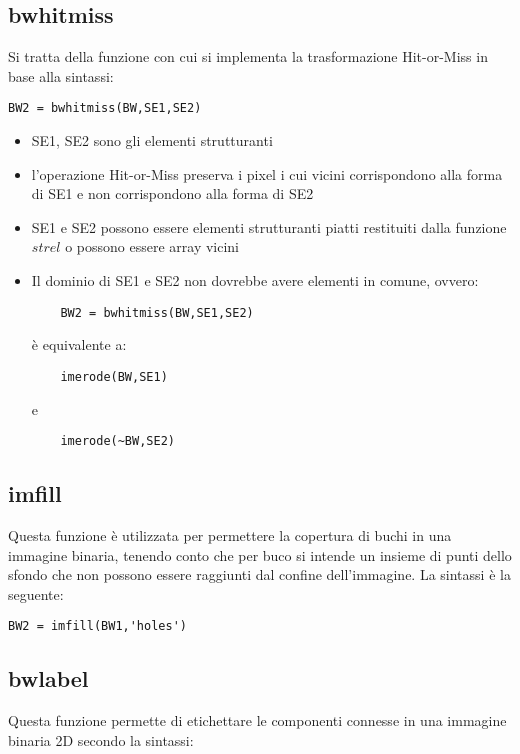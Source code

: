\subsection{bwhitmiss}
Si tratta della funzione con cui si implementa la trasformazione Hit-or-Miss in base alla sintassi:

\begin{lstlisting}
BW2 = bwhitmiss(BW,SE1,SE2)
\end{lstlisting}

\begin{itemize}
	\item SE1, SE2 sono gli elementi strutturanti
	\item l'operazione Hit-or-Miss preserva i pixel i cui vicini corrispondono alla forma di SE1 e non corrispondono alla forma di SE2
	\item SE1 e SE2 possono essere elementi strutturanti piatti restituiti dalla funzione $strel$ o possono essere array vicini
	
	\item Il dominio di SE1 e SE2 non dovrebbe avere elementi in comune, ovvero:
	
	\begin{lstlisting}
	BW2 = bwhitmiss(BW,SE1,SE2)
	\end{lstlisting}
	
	è equivalente a:
	
	\begin{lstlisting}
	imerode(BW,SE1)
	\end{lstlisting}
	
	e
	
	\begin{lstlisting}
	imerode(~BW,SE2)
	\end{lstlisting}
	
\end{itemize}

\subsection{imfill}
Questa funzione è utilizzata per permettere la copertura di buchi in una immagine binaria, tenendo conto che per buco si intende un insieme di punti dello sfondo che non possono essere raggiunti dal confine dell'immagine. La sintassi è la seguente:

\begin{lstlisting}
BW2 = imfill(BW1,'holes')
\end{lstlisting}

\subsection{bwlabel}
Questa funzione permette di etichettare le componenti connesse in una immagine binaria 2D secondo la sintassi:

